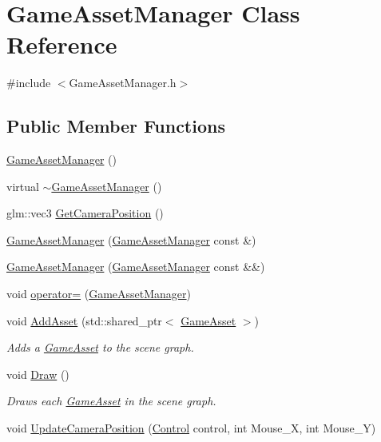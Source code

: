 \hypertarget{class_game_asset_manager}{}\section{Game\+Asset\+Manager Class Reference}
\label{class_game_asset_manager}


{\ttfamily \#include $<$Game\+Asset\+Manager.\+h$>$}

\subsection*{Public Member Functions}
\begin{DoxyCompactItemize}
\item 
\hyperlink{class_game_asset_manager_a84d0445928649e0d1e0f8e31ee137b17}{Game\+Asset\+Manager} ()
\item 
virtual \hyperlink{class_game_asset_manager_a1270bd61ecbcca563f079803e40c9b77}{$\sim$\+Game\+Asset\+Manager} ()
\item 
glm\+::vec3 \hyperlink{class_game_asset_manager_a1d9f1f5cc6630a10a0bf358dc2bcddef}{Get\+Camera\+Position} ()
\item 
\hyperlink{class_game_asset_manager_a2c9adcb72faa154c87eadc9bafe5269d}{Game\+Asset\+Manager} (\hyperlink{class_game_asset_manager}{Game\+Asset\+Manager} const \&)
\item 
\hyperlink{class_game_asset_manager_a44f6e2fd6b8ff1dd64e5697f1be7386d}{Game\+Asset\+Manager} (\hyperlink{class_game_asset_manager}{Game\+Asset\+Manager} const \&\&)
\item 
void \hyperlink{class_game_asset_manager_a7c9e4fce50b47b78652e7ff0b4dbb629}{operator=} (\hyperlink{class_game_asset_manager}{Game\+Asset\+Manager})
\item 
void \hyperlink{class_game_asset_manager_ad3de8ff00d55ba04728b1de8213b2349}{Add\+Asset} (std\+::shared\+\_\+ptr$<$ \hyperlink{class_game_asset}{Game\+Asset} $>$)
\begin{DoxyCompactList}\small\item\em Adds a \hyperlink{class_game_asset}{Game\+Asset} to the scene graph. \end{DoxyCompactList}\item 
void \hyperlink{class_game_asset_manager_a32837132bd70a9a9ed537323c2d3d886}{Draw} ()
\begin{DoxyCompactList}\small\item\em Draws each \hyperlink{class_game_asset}{Game\+Asset} in the scene graph. \end{DoxyCompactList}\item 
void \hyperlink{class_game_asset_manager_a459c51716179ef4b931f049be4aa69b4}{Update\+Camera\+Position} (\hyperlink{common_8h_a0da83e35f29c11f7f3c637234f2149f9}{Control} control, int Mouse\+\_\+\+X, int Mouse\+\_\+\+Y)
\end{DoxyCompactItemize}


